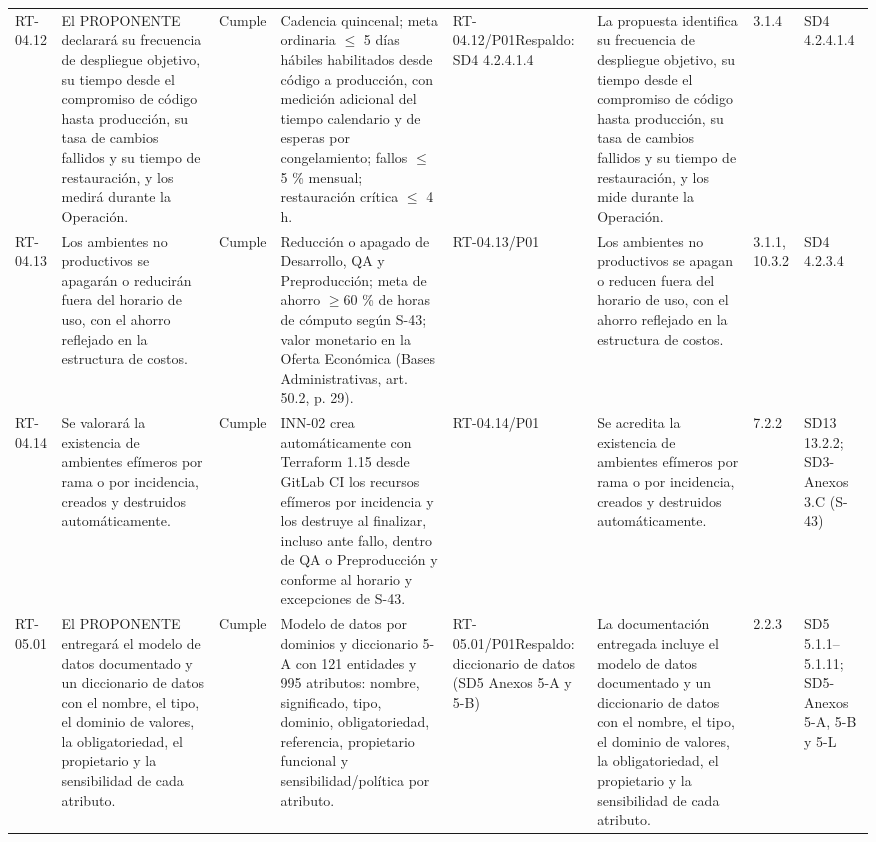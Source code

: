 \documentclass[oficio,firma,final]{lafrox}
\begin{document}
\begin{landscape}
{\begin{longtable}{@{}F{0.054} F{0.173} F{0.061} F{0.191} F{0.106} F{0.180} F{0.067} F{0.168}@{}}
  RT-04.12 & El PROPONENTE declarará su frecuencia de despliegue objetivo, su tiempo desde el compromiso de código hasta producción, su tasa de cambios fallidos y su tiempo de restauración, y los medirá durante la Operación. & Cumple & Cadencia quincenal; meta ordinaria $\leq$ 5 días hábiles habilitados desde código a producción, con medición adicional del tiempo calendario y de esperas por congelamiento; fallos $\leq$ 5 \% mensual; restauración crítica $\leq$ 4 h. & RT-04.12/\allowbreak{}P01\newline Respaldo: SD4 4.2.4.1.4 & La propuesta identifica su frecuencia de despliegue objetivo, su tiempo desde el compromiso de código hasta producción, su tasa de cambios fallidos y su tiempo de restauración, y los mide durante la Operación. & 3.1.4 & SD4 4.2.4.1.4  \\
  RT-04.13 & Los ambientes no productivos se apagarán o reducirán fuera del horario de uso, con el ahorro reflejado en la estructura de costos. & Cumple & Reducción o apagado de Desarrollo, QA y Preproducción; meta de ahorro $\geq$60 \% de horas de cómputo según S-43; valor monetario en la Oferta Económica (Bases Administrativas, art. 50.2, p. 29). & RT-04.13/\allowbreak{}P01 & Los ambientes no productivos se apagan o reducen fuera del horario de uso, con el ahorro reflejado en la estructura de costos. & 3.1.1, 10.3.2 & SD4 4.2.3.4  \\
  RT-04.14 & Se valorará la existencia de ambientes efímeros por rama o por incidencia, creados y destruidos automáticamente. & Cumple & INN-02 crea automáticamente con Terraform 1.15 desde GitLab CI los recursos efímeros por incidencia y los destruye al finalizar, incluso ante fallo, dentro de QA o Preproducción y conforme al horario y excepciones de S-43. & RT-04.14/\allowbreak{}P01 & Se acredita la existencia de ambientes efímeros por rama o por incidencia, creados y destruidos automáticamente. & 7.2.2 & SD13 13.2.2; SD3-Anexos 3.C (S-43)  \\
  RT-05.01 & El PROPONENTE entregará el modelo de datos documentado y un diccionario de datos con el nombre, el tipo, el dominio de valores, la obligatoriedad, el propietario y la sensibilidad de cada atributo. & Cumple & Modelo de datos por dominios y diccionario 5-A con 121 entidades y 995 atributos: nombre, significado, tipo, dominio, obligatoriedad, referencia, propietario funcional y sensibilidad/política por atributo. & RT-05.01/\allowbreak{}P01\newline Respaldo: diccionario de datos (SD5 Anexos 5-A y 5-B) & La documentación entregada incluye el modelo de datos documentado y un diccionario de datos con el nombre, el tipo, el dominio de valores, la obligatoriedad, el propietario y la sensibilidad de cada atributo. & 2.2.3 & SD5 5.1.1–5.1.11; SD5-Anexos 5-A, 5-B y 5-L  \\

\end{longtable}}
\end{landscape}
\end{document}
